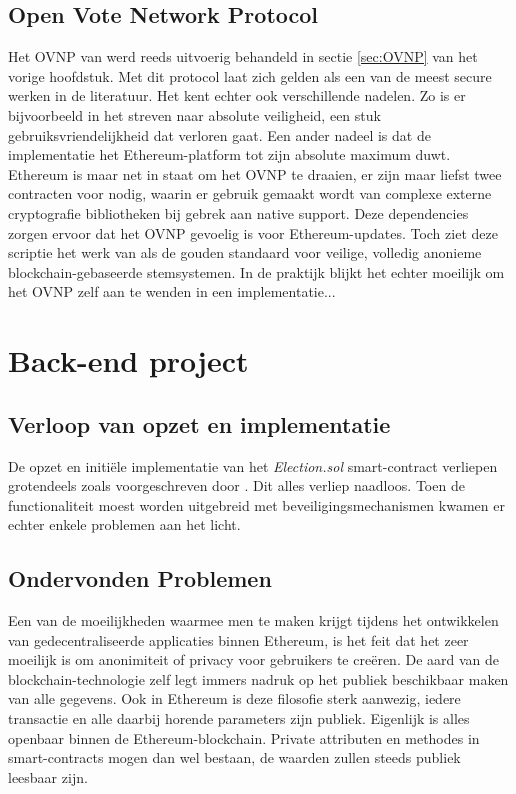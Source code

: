 	\subsection{Open Vote Network Protocol}
	Het OVNP van \textcite{McCorry2017} werd reeds uitvoerig behandeld in sectie \ref{sec:OVNP} van het vorige hoofdstuk. Met dit protocol laat \textcite{McCorry2017} zich gelden als een van de meest secure werken in de literatuur. Het kent echter ook verschillende nadelen. Zo is er bijvoorbeeld in het streven naar absolute veiligheid, een stuk gebruiksvriendelijkheid dat verloren gaat. Een ander nadeel is dat de implementatie het Ethereum-platform tot zijn absolute maximum duwt. Ethereum is maar net in staat om het OVNP te draaien, er zijn maar liefst twee contracten voor nodig, waarin er gebruik  gemaakt wordt van complexe externe cryptografie bibliotheken bij gebrek aan native support. Deze dependencies zorgen ervoor dat het OVNP gevoelig is voor Ethereum-updates. Toch ziet deze scriptie het werk van \textcite{McCorry2017} als de gouden standaard voor veilige, volledig anonieme blockchain-gebaseerde stemsystemen. In de praktijk blijkt het echter moeilijk om het OVNP zelf aan te wenden in een implementatie...
	
\section{Back-end project}
	\subsection{Verloop van opzet en implementatie}
	De opzet en initiële implementatie van het \textit{Election.sol} smart-contract verliepen grotendeels zoals voorgeschreven door \textcite{McCubin2019}. Dit alles verliep naadloos. Toen de functionaliteit moest worden uitgebreid met beveiligingsmechanismen kwamen er echter enkele problemen aan het licht.
	
	\subsection{Ondervonden Problemen}
	Een van de moeilijkheden waarmee men te maken krijgt tijdens het ontwikkelen van gedecentraliseerde applicaties binnen Ethereum, is het feit dat het zeer moeilijk is om anonimiteit of privacy voor gebruikers te creëren. De aard van de blockchain-technologie zelf legt immers nadruk op het publiek beschikbaar maken van alle gegevens. Ook in Ethereum is deze filosofie sterk aanwezig, iedere transactie en alle daarbij horende parameters zijn publiek. Eigenlijk is alles openbaar binnen de Ethereum-blockchain. Private attributen en methodes in smart-contracts mogen dan wel bestaan, de waarden zullen steeds publiek leesbaar zijn. \autocite{Buterin2014}
	

